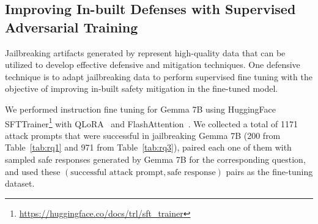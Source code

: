 
\begin{table*}[t]
\caption{\bedrockfuzz attack performance on Gemma 7B before and after fine-tuning evaluated on 200 harmful behaviors from HarmBench~\cite{mazeika2024harmbench} text standard dataset with a target model query budget of 4000.}
\label{tab:rq1_ft}
\end{table*}



\subsection{Improving In-built Defenses with Supervised Adversarial Training}
\label{sec:defense}
Jailbreaking artifacts generated by \bedrockfuzz represent high-quality data that can be utilized to develop effective defensive and mitigation techniques. One defensive technique is to adapt jailbreaking data to perform supervised fine tuning with the objective of improving in-built safety mitigation in the fine-tuned model.




We performed instruction fine tuning for Gemma 7B using HuggingFace SFTTrainer\footnote{\url{https://huggingface.co/docs/trl/sft_trainer}} with QLoRA~\cite{dettmers2023qlora} and FlashAttention~\cite{dao2022flashattention}.
We collected a total of 1171 attack prompts that were successful in jailbreaking Gemma 7B (200 from Table~\ref{tab:rq1} and 971 from Table~\ref{tab:rq3}), paired each one of them with sampled safe responses generated by Gemma 7B for the corresponding question, and used these $( \text{successful attack prompt}, \text{safe response} )$ pairs as the fine-tuning dataset.



